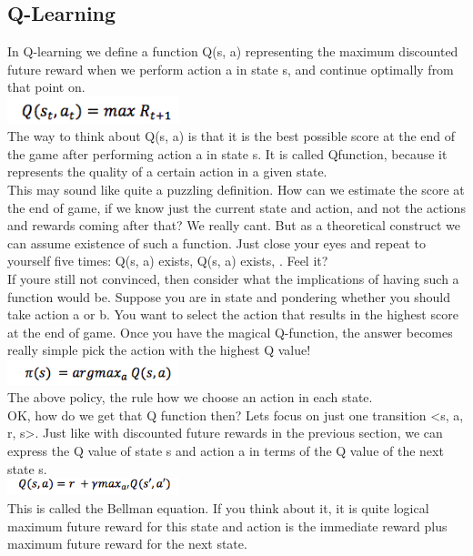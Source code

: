 \documentclass[twoside,letterpaper]{article}
\begin{document}
\subsection[Q-Learning]{\rmfamily\bfseries\color{black}
Q-Learning}
{\color{black}
In Q-learning we define a function Q(s, a) representing the maximum discounted future reward when we perform action a in state s, and continue optimally from that point on.\\
\centering
\includegraphics[width=5cm]{images/q.png}\\
The way to think about Q(s, a) is that it is the best possible score at the end of the game after performing action a in state s. It is called Qfunction, because it represents the quality of a certain action in a given state.\\

This may sound like quite a puzzling definition. How can we estimate the score at the end of game, if we know just the current state and action, and not the actions and rewards coming after that? We really cant. But as a theoretical construct we can assume existence of such a function. Just close your eyes and repeat to yourself five times: Q(s, a) exists, Q(s, a) exists, . Feel it?\\

If youre still not convinced, then consider what the implications of having such a function would be. Suppose you are in state and pondering whether you should take action a or b. You want to select the action that results in the highest score at the end of game. Once you have the magical Q-function, the answer becomes really simple pick the action with the highest Q value!\\
\includegraphics[width=5cm]{images/q2.png}\\
\centering
The above policy, the rule how we choose an action in each state.\\

OK, how do we get that Q function then? Lets focus on just one transition <s, a, r, s\textquotesingle>. Just like with discounted future rewards in the previous section, we can express the Q value of state s and action a in terms of the Q value of the next state s\textquotesingle.\\
\includegraphics[width=5cm]{images/q3.png}\\
This is called the Bellman equation. If you think about it, it is quite logical maximum future reward for this state and action is the immediate reward plus maximum future reward for the next state.

}
\end{document}
